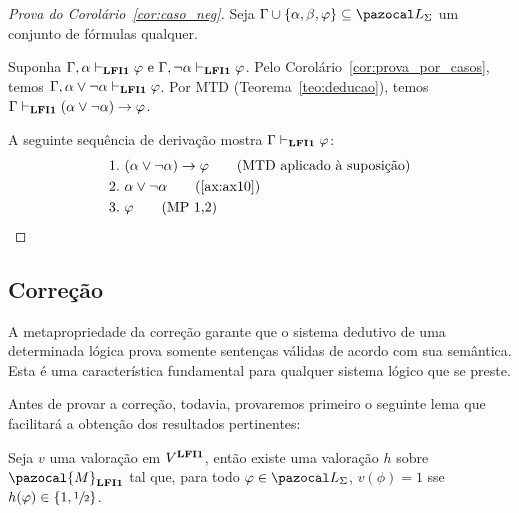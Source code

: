         \begin{proof}[Prova do Corolário~\ref{cor:caso_neg}]
            Seja $\Gamma \cup \{\alpha, \beta, \phi\} \subseteq \ling{}$ um conjunto de fórmulas qualquer.

            Suponha $\Gamma, \alpha \vdash_{{\normalfont\textbf{LFI1}}{}} \varphi \text{ e }\Gamma, \neg\alpha \vdash_{{\normalfont\textbf{LFI1}}{}} \varphi$. Pelo Corolário~\ref{cor:prova_por_casos}, temos $\Gamma, \alpha \lor \neg \alpha \vdash_{{\normalfont\textbf{LFI1}}{}} \varphi$. Por MTD (Teorema~\ref{teo:deducao}), temos $\Gamma \vdash_{{\normalfont\textbf{LFI1}}{}} (\alpha \lor \neg \alpha) \to \varphi$.

            A seguinte sequência de derivação mostra $\Gamma\vdash_{{\normalfont\textbf{LFI1}}{}} \varphi$:
            \begin{align*}
                1. ~& (\alpha \lor \neg \alpha) \to \phi\tag{MTD aplicado à suposição} \\
                2. ~& \alpha \lor \neg \alpha \tag{\ref{ax:ax10}} \\
                3. ~& \phi \tag{MP 1,2}
            \end{align*}
        \end{proof}

    \subsection{Correção}\label{sec:cor}
        A metapropriedade da correção garante que o sistema dedutivo de uma determinada lógica prova somente sentenças válidas de acordo com sua semântica. Esta é uma característica fundamental para qualquer sistema lógico que se preste. 

        Antes de provar a correção, todavia, provaremos primeiro o seguinte lema que facilitará a obtenção dos resultados pertinentes:

        \begin{lema}\label{lem:matval}
            Seja $v$ uma valoração em $V^{{\normalfont\textbf{LFI1}}}$, então existe uma valoração $h$ sobre $\pazocal{M}_{\lfium}$ tal que, para todo $\phi \in \ling{}$, $v(\phi) = 1$ sse $h(\varphi) \in \{1, \sfrac{1}{2}{}\}$.
        \end{lema}

